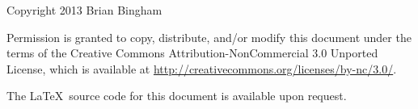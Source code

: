\documentclass[11pt]{book}
\newcommand{\thisgls}{temp}  %
\begin{document}
\maketitle

\vspace*{0.2in} %
 
\begin{center}
{\Large \thetitle}

\vspace{0.25in}
Copyright 2013 Brian Bingham
\end{center}

Permission is granted to copy, distribute, and/or modify this document
under the terms of the Creative Commons Attribution-NonCommercial 3.0 Unported
License, which is available at \url{http://creativecommons.org/licenses/by-nc/3.0/}.

The \LaTeX\ source code for this document is available upon request.




\setcounter{tocdepth}{1}
\tableofcontents

\mainmatter

\renewcommand{\thisgls}{linsys}


\printglossary[type=\thisgls]
\glsresetall

\renewcommand{\thisgls}{feedback}


\printglossary[type=\thisgls]
\glsresetall

\renewcommand{\thisgls}{models}


\printglossary[type=\thisgls]
\glsresetall

\renewcommand{\thisgls}{statespace}


\printglossary[type=\thisgls]
\glsresetall

\renewcommand{\thisgls}{behavior}


\printglossary[type=\thisgls]
\glsresetall

%
%


\end{document}
